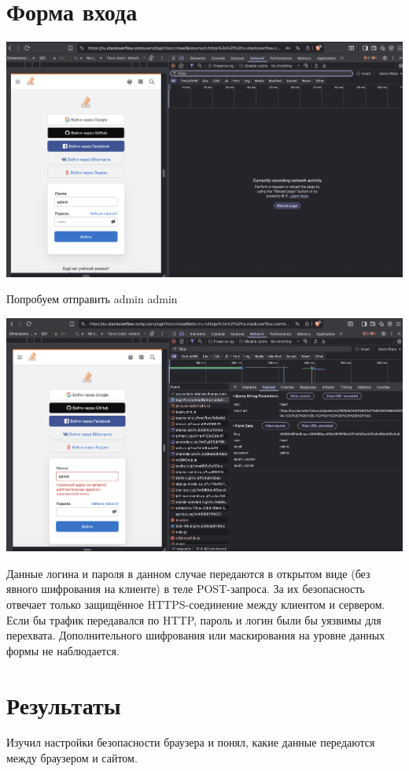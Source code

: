 \documentclass{article}
\begin{document}
\section{Форма входа}

\begin{center}
  \includegraphics[width=.9\textwidth]{12}
\end{center}

Попробуем отправить admin admin 
\begin{center}
  \includegraphics[width=.9\textwidth]{13}
\end{center}
Данные логина и пароля в данном случае передаются в открытом виде (без явного шифрования на клиенте) в теле POST-запроса. За их безопасность отвечает только защищённое HTTPS-соединение между клиентом и сервером. Если бы трафик передавался по HTTP, пароль и логин были бы уязвимы для перехвата. Дополнительного шифрования или маскирования на уровне данных формы не наблюдается.

\section*{Результаты}
Изучил настройки безопасности браузера и понял, какие данные передаются между
браузером и сайтом.
\end{document}
